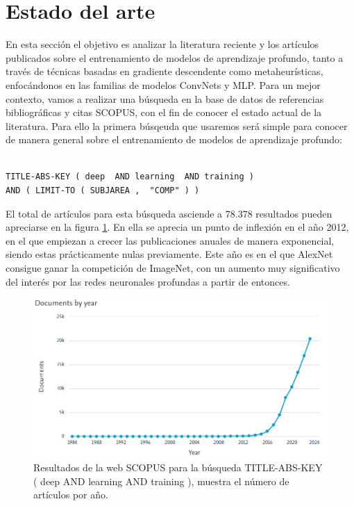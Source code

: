 \section{Estado del arte}

En esta sección el objetivo es analizar la literatura reciente y los artículos publicados sobre el entrenamiento de modelos de aprendizaje profundo, tanto a través de técnicas basadas en gradiente descendente como metaheurísticas, enfocándonos en las familias de modelos ConvNets y MLP. Para un mejor contexto, vamos a realizar una búsqueda en la base de datos de referencias bibliográficas y citas SCOPUS, con el fin de conocer el estado actual de la literatura. Para ello la primera búsqeuda que usaremos será simple para conocer de manera general sobre el entrenamiento de modelos de aprendizaje profundo:


\begin{verbatim}

TITLE-ABS-KEY ( deep  AND learning  AND training )
AND ( LIMIT-TO ( SUBJAREA ,  "COMP" ) ) 

\end{verbatim}

El total de artículos para esta búsqueda asciende a 78.378 resultados pueden apreciarse en la figura \ref{fig:scopus_deep}. En ella se aprecia un punto de inflexión en el año 2012, en el que empiezan a crecer las publicaciones anuales de manera exponencial, siendo estas prácticamente nulas previamente. Este año es en el que AlexNet consigue ganar la competición de ImageNet, con un aumento muy significativo del interés por las redes neuronales profundas a partir de entonces. 

\begin{figure}
    \centering
    \includegraphics[width=0.75\linewidth]{Plantilla_TFG_latex//imagenes//Inf//EdA/scopus_deep.png}
    \caption{Resultados de la web SCOPUS para la búsqueda TITLE-ABS-KEY ( deep  AND learning  AND training ), muestra el número de artículos por año.}
    \label{fig:scopus_deep}
\end{figure}


